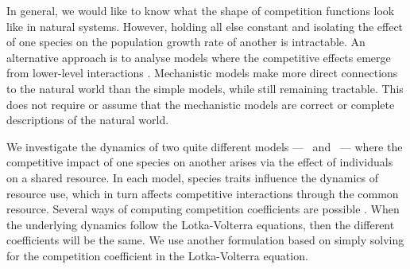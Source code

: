 \documentclass[a4paper,11pt]{article}
\begin{document}
In general, we would like to know what the shape of competition
functions look like in natural systems.  However, holding all else
constant and isolating the effect of one species on the population
growth rate of another is intractable.
%
An alternative approach is to analyse models where the competitive
effects emerge from lower-level interactions
\citep[e.g.,][]{Draghi-2012}.  Mechanistic models make more direct
connections to the natural world than the simple models,
while still remaining tractable.  This does not require or assume that
the mechanistic models are correct or complete descriptions of the
natural world.



We investigate the dynamics of two quite different models --- \plant\
and \Rstar\ --- where the competitive impact of one species on another
arises via the effect of individuals on a shared resource.
%
In each model, species traits influence the dynamics of resource use,
which in turn affects competitive interactions through the common
resource.  Several ways of computing competition coefficients are
possible \citep[e.g.,][]{Abrams-1987,Abrams-2008}.  When the
underlying dynamics follow the Lotka-Volterra equations, then the
different coefficients will be the same.  We use another formulation
based on simply solving for the competition coefficient in the
Lotka-Volterra equation.
\end{document}
